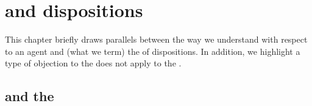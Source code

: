 \chapter{ and dispositions}
\label{cha:tc2-dispositions}


\begin{note}
  This chapter briefly draws parallels between the way we understand  with respect to an agent \tC{} and (what we term) the  of dispositions.
  In addition, we highlight a type of objection to the  does not apply to the .
\end{note}



\section{ and the }
\label{sec:dispositions}


